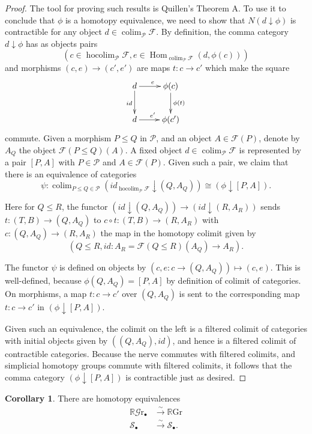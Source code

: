 \documentclass[edeposit,fullpage]{uiucthesis2009}
\newcommand{\mc}{\mathcal}
\newcommand{\RGr}{\mathbb R\mathrm{Gr}}
\newcommand{\hRGr}{\mathbb R\mathscr{G}{\mathrm{r}}}
\DeclareMathOperator*{\hocolim}{hocolim}
\DeclareMathOperator*{\colim}{colim}
\DeclareMathOperator{\Hom}{Hom}
\theoremstyle{plain}
\numberwithin{lemma}{section}
\theoremstyle{definition}
\newtheorem{corollary}[lemma]{Corollary}
\begin{document}
\begin{proof}
The tool for proving such results is Quillen's Theorem A. To use it to
conclude that $\phi$ is a homotopy equivalence, we need to show that
$N(d \downarrow \phi)$ is contractible for any object $d \in \colim_{\mathscr
  P} \mathscr F$. By definition, the comma category $d \downarrow
\phi$ has as objects pairs 
\[
 (c \in \hocolim_{\mathscr P} \mathscr F, e \in \Hom_{\colim_{\mathscr
  P} \mathscr F}(d, \phi(c)))
\] 
and morphisms $(c,e) \rightarrow (c',e')$ are maps $t: c \rightarrow c'$
which make the square
\[
\xymatrix{d \ar[r]^e \ar[d]_{id} & \phi(c) \ar[d]^{\phi(t)} \\ d \ar[r]^{e'} & \phi(c')} 
\]
commute. Given a morphism $P \leq Q$ in $\mathscr P$, and an object $A
\in \mathscr F(P)$, denote by $A_Q$
the object
$\mathscr F(P\leq Q)(A)$. A fixed object $d \in \colim_{\mathscr
  P} \mathscr F$ is represented by a pair $[P,A]$ with $P \in \mathscr
P$ and $A \in \mathscr F(P)$. Given such a pair, we claim that there
is an equivalence of categories
\[
\psi : \colim_{P \leq Q \in \mathscr P}(id_{\hocolim_{\mathscr P} \mathscr F} \downarrow (Q,A_Q)) \cong (\phi \downarrow [P,A]).
\]

Here for $Q \leq R$, the functor $(id \downarrow (Q,A_Q)) \rightarrow
(id \downarrow (R,A_R))$ sends $t : (T,B) \rightarrow (Q,A_Q)$ to $c
\circ t : (T,B) \rightarrow (R,A_R)$ with $c : (Q,A_Q) \rightarrow
(R,A_R)$ the map in the homotopy colimit given by 
\[
(Q \leq R,id: A_R = \mathscr F(Q \leq R)(A_Q)
\rightarrow A_R).
\]

The functor $\psi$ is defined on objects by $(c,e: c\rightarrow
(Q,A_Q)) \mapsto (c,e)$. This is well-defined, because $\phi(Q,A_Q) =
[P,A]$ by definition of colimit of categories. On morphisms, a map $t:
c \rightarrow c'$ over $(Q,A_Q)$ is sent to the corresponding map $t :
c \rightarrow c'$ in $(\phi \downarrow [P,A])$.

Given such an equivalence, the colimit on the left is a filtered
colimit of categories with initial objects given by $((Q,A_Q),id)$,
and hence is a filtered colimit of contractible
categories. Because the nerve commutes with filtered colimits, and
simplicial homotopy groups commute with filtered colimits, it follows
that the comma category $(\phi \downarrow [P,A])$ is contractible just
as desired.
\end{proof}

\begin{corollary}\label{cor:htpy_RGr_compare}
There are homotopy equivalences
\begin{align*}
\hRGr_\bullet &\xrightarrow{\sim} \RGr\\
\mathscr S_\bullet &\xrightarrow{\sim} \mc S_\bullet.
\end{align*}
\end{corollary}
\end{document}
